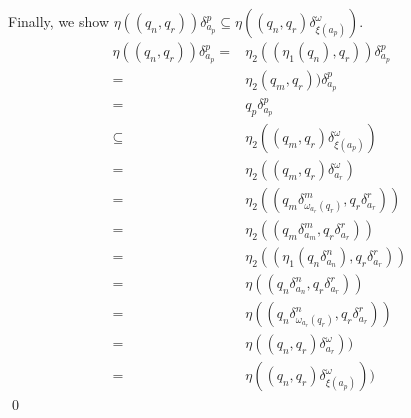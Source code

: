 \documentclass[a4paper,12pt,numbers=noenddot]{scrreport}
\begin{document}
Finally, we show $\eta((q_n,q_r))\delta^p_{a_p} \subseteq \eta((q_n, q_r) \delta^\omega_{\xi(a_p)})$.
\begin{align*}
    \eta((q_n,q_r))\delta^p_{a_p} = & \eta_2((\eta_1 (q_n),q_r))\delta^p_{a_p} \tag{def. $\eta, \eta_1$} \\
                      = & \eta_2(q_m,q_r))\delta^p_{a_p} \tag{def. $\eta_2$} \\
                      = & q_p\delta^p_{a_p} \tag{$P \leq M \omega R$} \\
                      \subseteq & \eta_2((q_m, q_r) \delta^\omega_{\xi(a_p)}) \tag{def. $\xi$}\\
                      = & \eta_2((q_m, q_r) \delta^\omega_{a_r}) \tag{def. $\delta^\omega$}\\
                      = & \eta_2((q_m \delta^m_{\omega_{a_r}(q_r)}, q_r \delta^r_{a_r})) \tag{def. $\omega$}\\
                      = & \eta_2((q_m \delta^m_{a_m}, q_r \delta^r_{a_r})) \tag{$M \leq N$}\\
                      = & \eta_2((\eta_1(q_n \delta^n_{a_n}), q_r \delta^r_{a_r})) \tag{def. $\eta$}\\
                      = & \eta((q_n \delta^n_{a_n}, q_r \delta^r_{a_r})) \tag{def. $\omega$}\\
                      = & \eta((q_n \delta^n_{\omega_{a_r}(q_r)}, q_r \delta^r_{a_r})) \tag{def. $\delta^\omega$}\\
                      = & \eta((q_n, q_r) \delta^\omega_{a_r})) \tag{def. $\xi$}\\
                      = & \eta((q_n, q_r) \delta^\omega_{\xi(a_p)}))
\end{align*}
\qed
\section{}
\end{document}

